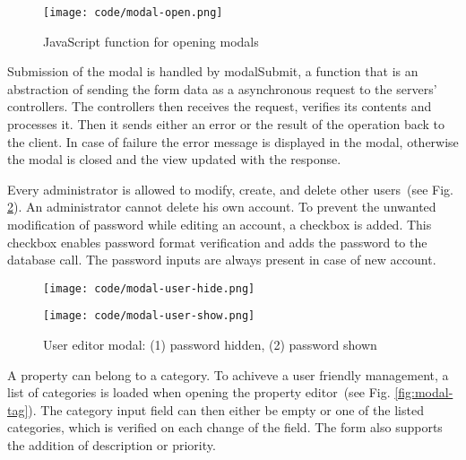 \documentclass[
  digital,     %
  oneside,     %
  nosansbold,  %
  colorbold, %
  lof,         %
  lot,         %
]{fithesis4}
\newcommand{\imgref}[1]{(see Fig. \ref{fig:#1})}
\begin{document}
\begin{figure}
	\begin{center}
		\begin{minipage}{.8\textwidth}
			\texttt{[image: code/modal-open.png]}
		\end{minipage}
	\end{center}
	\caption{JavaScript function for opening modals}
	\label{fig:modal-open}
\end{figure}

Submission of the modal is handled by modalSubmit, a function that is an abstraction of sending the
form data as a asynchronous request to the servers' controllers. The controllers then receives the
request, verifies its contents and processes it. Then it sends either an error or the result of the
operation back to the client. In case of failure the error message is displayed in the modal, otherwise
the modal is closed and the view updated with the response.

Every administrator is allowed to modify, create, and delete other users~\imgref{modal-user}. An
administrator cannot delete his own account. To prevent the unwanted modification of password
while editing an account, a checkbox is added. This checkbox enables password format verification and
adds the password to the database call. The password inputs are always present in case of new
account.

\begin{figure}[!htbp]
	\begin{center}
		\begin{minipage}{.4\textwidth}
			\texttt{[image: code/modal-user-hide.png]}
		\end{minipage}
		\begin{minipage}{.4\textwidth}
			\texttt{[image: code/modal-user-show.png]}
		\end{minipage}
	\end{center}
	\caption{User editor modal: (1) password hidden, (2) password shown}
	\label{fig:modal-user}
\end{figure}

A property can belong to a category. To achiveve a user friendly management, a list of categories is
loaded when opening the property editor~\imgref{modal-tag}. The category input field can then
either be empty or one of the listed categories, which is verified on each change of the field. The form
also supports the addition of description or priority.
\end{document}
